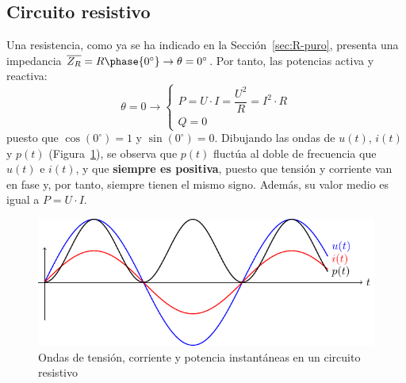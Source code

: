 	\subsection{Circuito resistivo}\label{sec.potencia_R}
	Una resistencia, como ya se ha indicado en la
        Sección~\ref{sec:R-puro}, presenta una impedancia
        $\overline{Z_R}=R\phase{0^\circ}\rightarrow
        \theta=0^\circ$. Por tanto, las potencias activa y reactiva:
	\begin{equation}
          \theta = 0 \rightarrow
          \boxed{\begin{cases}
            P = U\cdot I = \dfrac{U^2}{R} = I^2\cdot R\\
            Q = 0
          \end{cases}}
      \end{equation}
      puesto que $\cos(0^\circ)=1$ y $\sin(0^\circ)=0$. Dibujando las
      ondas de $u(t)$, $i(t)$ y $p(t)$
      (Figura~\ref{fig.resistivoPotencia}), se observa que $p(t)$
      fluctúa al doble de frecuencia que $u(t)$ e $i(t)$, y que
      \textbf{siempre es positiva}, puesto que tensión y corriente van
      en fase y, por tanto, siempre tienen el mismo signo. Además, su
      valor medio es igual a $P=U\cdot I$.
      \begin{figure}[H]
        \centering \includegraphics{../figs/resistivoPotencia.pdf}
        \caption{Ondas de tensión, corriente y potencia instantáneas
          en un circuito resistivo}
        \label{fig.resistivoPotencia}
      \end{figure}
	
